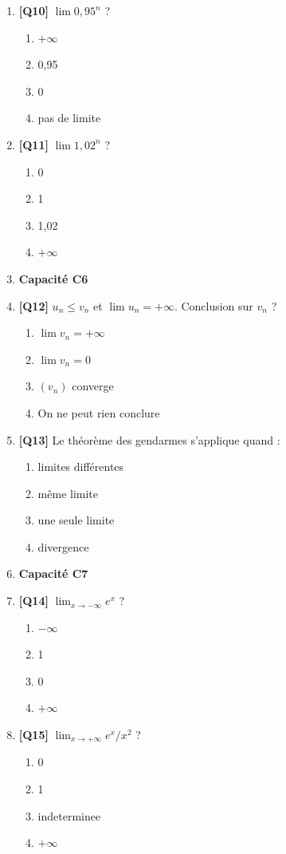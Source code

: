 \begin{enumerate}
\item \textbf{[Q10]} $\lim 0{,}95^n$ ?
  \begin{enumerate}[label=\Alph*.]
    \item $+\infty$
    \item 0,95
    \item 0
    \item pas de limite
  \end{enumerate}

\item \textbf{[Q11]} $\lim 1{,}02^n$ ?
  \begin{enumerate}[label=\Alph*.]
    \item 0
    \item 1
    \item 1,02
    \item $+\infty$
  \end{enumerate}

\item[] \textbf{Capacité C6}

\item \textbf{[Q12]} $u_n \leq v_n$ et $\lim u_n = +\infty$. Conclusion sur $v_n$ ?
  \begin{enumerate}[label=\Alph*.]
    \item $\lim v_n = +\infty$
    \item $\lim v_n = 0$
    \item $(v_n)$ converge
    \item On ne peut rien conclure
  \end{enumerate}

\item \textbf{[Q13]} Le théorème des gendarmes s'applique quand :
  \begin{enumerate}[label=\Alph*.]
    \item limites différentes
    \item même limite
    \item une seule limite
    \item divergence
  \end{enumerate}

\item[] \textbf{Capacité C7}

\item \textbf{[Q14]} $\lim_{x \to -\infty} e^x$ ?
  \begin{enumerate}[label=\Alph*.]
    \item $-\infty$
    \item 1
    \item 0
    \item $+\infty$
  \end{enumerate}

\item \textbf{[Q15]} $\lim_{x \to +\infty} e^x / x^2$ ?
  \begin{enumerate}[label=\Alph*.]
    \item 0
    \item 1
    \item indeterminee
    \item $+\infty$
  \end{enumerate}

\end{enumerate}

